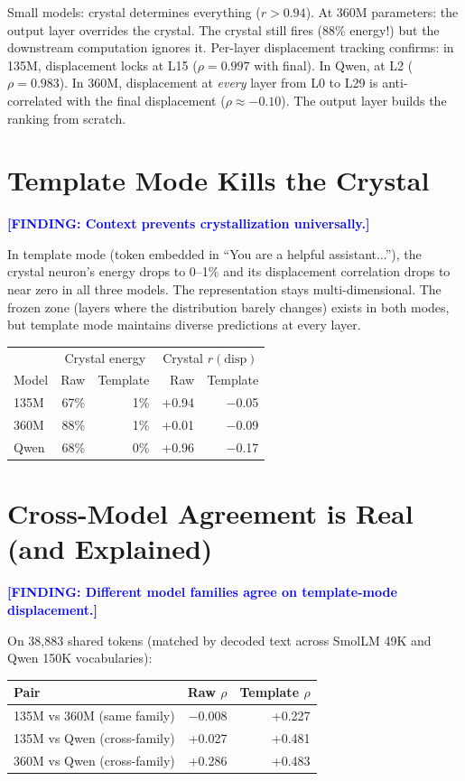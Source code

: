 \documentclass[11pt]{article}
\newcommand{\finding}[1]{\textcolor{blue}{\textbf{[FINDING: #1]}}}
\begin{document}
Small models: crystal determines everything ($r > 0.94$). At 360M parameters: the output layer overrides the crystal. The crystal still fires (88\% energy!) but the downstream computation ignores it. Per-layer displacement tracking confirms: in 135M, displacement locks at L15 ($\rho = 0.997$ with final). In Qwen, at L2 ($\rho = 0.983$). In 360M, displacement at \emph{every} layer from L0 to L29 is anti-correlated with the final displacement ($\rho \approx -0.10$). The output layer builds the ranking from scratch.

\section{Template Mode Kills the Crystal}

\finding{Context prevents crystallization universally.}

In template mode (token embedded in ``You are a helpful assistant...''), the crystal neuron's energy drops to 0--1\% and its displacement correlation drops to near zero in all three models. The representation stays multi-dimensional. The frozen zone (layers where the distribution barely changes) exists in both modes, but template mode maintains diverse predictions at every layer.

\begin{center}
\begin{tabular}{lrrrr}
\toprule
& \multicolumn{2}{c}{Crystal energy} & \multicolumn{2}{c}{Crystal $r(\text{disp})$} \\
Model & Raw & Template & Raw & Template \\
\midrule
135M & 67\% & 1\% & +0.94 & $-$0.05 \\
360M & 88\% & 1\% & +0.01 & $-$0.09 \\
Qwen & 68\% & 0\% & +0.96 & $-$0.17 \\
\bottomrule
\end{tabular}
\end{center}

\section{Cross-Model Agreement is Real (and Explained)}

\finding{Different model families agree on template-mode displacement.}

On 38,883 shared tokens (matched by decoded text across SmolLM 49K and Qwen 150K vocabularies):

\begin{center}
\begin{tabular}{lrr}
\toprule
Pair & Raw $\rho$ & Template $\rho$ \\
\midrule
135M vs 360M (same family) & $-$0.008 & +0.227 \\
135M vs Qwen (cross-family) & +0.027 & +0.481 \\
360M vs Qwen (cross-family) & +0.286 & +0.483 \\
\bottomrule
\end{tabular}
\end{center}
\end{document}
